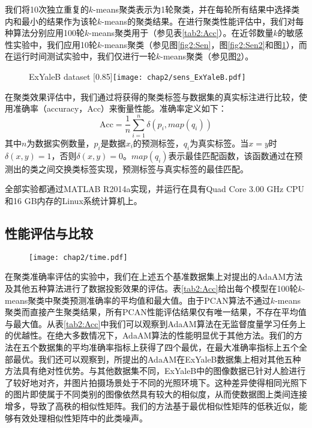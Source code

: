 \begin{itemize}
我们将10次独立重复的$k$-means聚类表示为1轮聚类，并在每轮所有结果中选择类内和最小的结果作为该轮$k$-means的聚类结果。在进行聚类性能评估中，我们对每种算法分别应用100轮$k$-means聚类用于（参见表\ref{tab2:Acc}）。在近邻数量$k$的敏感性实验中，我们应用10轮$k$-means聚类（参见图\ref{fig2:Sen}，图\ref{fig2:Sen2}和图\ref{fig2:Sen3}），而在运行时间测试实验中，我们仅进行一轮$k$-means聚类（参见图\ref{fig2:Time}）。


\begin{figure}[t]
					{ExYaleB dataset}
					[0.85\textwidth]{\texttt{[image: chap2/sens\_ExYaleB.pdf]}}
	\label{fig2:Sen3}
\end{figure} 
在聚类效果评估中，我们通过将获得的聚类标签与数据集的真实标注进行比较，使用准确率（accuracy，Acc）来衡量性能。准确率定义如下：
\begin{equation}
	\mathrm{Acc} = \frac{1}{n}\sum^{n}_{i=1}\delta(p_i, map(q_i))
\end{equation}
其中$n$为数据实例数量，$p_i$是数据$x_i$的预测标签，$q_i$为真实标签。当$x=y$时$\delta(x, y) = 1$，否则$\delta(x,y) = 0$。$map(q_i)$表示最佳匹配函数，该函数通过在预测出的类之间交换类标签实现，预测标签与真实标签的最佳匹配。

全部实验都通过MATLAB R2014a实现，并运行在具有Quad Core 3.00 GHz CPU和16 GB内存的Linux系统计算机上。

\subsection{性能评估与比较}
\begin{figure}[t]
	\centering
	\texttt{[image: chap2/time.pdf]}
	\label{fig2:Time}
\end{figure}

在聚类准确率评估的实验中，我们在上述五个基准数据集上对提出的AdaAM方法及其他五种算法进行了数据投影效果的评估。表\ref{tab2:Acc}给出每个模型在100轮$k$-means聚类中聚类预测准确率的平均值和最大值。由于PCAN算法不通过$k$-means聚类而直接产生聚类结果，所有PCAN性能评估结果仅有唯一结果，不存在平均值与最大值。从表\ref{tab2:Acc}中我们可以观察到AdaAM算法在无监督度量学习任务上的优越性。在绝大多数情况下，AdaAM算法的性能明显优于其他方法。我们的方法在五个数据集的平均准确率指标上获得了四个最优，在最大准确率指标上五个全部最优。我们还可以观察到，所提出的AdaAM在ExYaleB数据集上相对其他五种方法具有绝对性优势。与其他数据集不同，ExYaleB中的图像数据已针对人脸进行了较好地对齐，并图片拍摄场景处于不同的光照环境下。这种差异使得相同光照下的图片即使属于不同类别的图像依然具有较大的相似度，从而使数据图上类间连接增多，导致了高秩的相似性矩阵。我们的方法基于最优相似性矩阵的低秩近似，能够有效处理相似性矩阵中的此类噪声。


\end{itemize}
